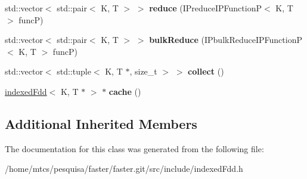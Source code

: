 \begin{DoxyCompactItemize}
\item 
\hypertarget{classfaster_1_1indexedFdd_3_01K_00_01T_01_5_01_4_a39d927d2e023fc62647fad54b73f1c4b}{}std\+::vector$<$ std\+::pair$<$ K, T $>$ $>$ {\bfseries reduce} (I\+Preduce\+I\+P\+Function\+P$<$ K, T $>$ func\+P)\label{classfaster_1_1indexedFdd_3_01K_00_01T_01_5_01_4_a39d927d2e023fc62647fad54b73f1c4b}

\item 
\hypertarget{classfaster_1_1indexedFdd_3_01K_00_01T_01_5_01_4_a0f89674fe2c844c623198bbdba8d58eb}{}std\+::vector$<$ std\+::pair$<$ K, T $>$ $>$ {\bfseries bulk\+Reduce} (I\+Pbulk\+Reduce\+I\+P\+Function\+P$<$ K, T $>$ func\+P)\label{classfaster_1_1indexedFdd_3_01K_00_01T_01_5_01_4_a0f89674fe2c844c623198bbdba8d58eb}

\item 
\hypertarget{classfaster_1_1indexedFdd_3_01K_00_01T_01_5_01_4_a062614e61759dd430e27026e70280ac0}{}std\+::vector$<$ std\+::tuple$<$ K, T $\ast$, size\+\_\+t $>$ $>$ {\bfseries collect} ()\label{classfaster_1_1indexedFdd_3_01K_00_01T_01_5_01_4_a062614e61759dd430e27026e70280ac0}

\item 
\hypertarget{classfaster_1_1indexedFdd_3_01K_00_01T_01_5_01_4_a0285162c1cd6bb853daad827dd1f94fc}{}\hyperlink{classfaster_1_1indexedFdd}{indexed\+Fdd}$<$ K, T $\ast$ $>$ $\ast$ {\bfseries cache} ()\label{classfaster_1_1indexedFdd_3_01K_00_01T_01_5_01_4_a0285162c1cd6bb853daad827dd1f94fc}

\end{DoxyCompactItemize}
\subsection*{Additional Inherited Members}


The documentation for this class was generated from the following file\+:\begin{DoxyCompactItemize}
\item 
/home/mtcs/pesquisa/faster/faster.\+git/src/include/indexed\+Fdd.\+h\end{DoxyCompactItemize}
